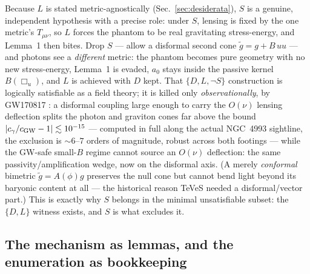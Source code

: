 \documentclass[11pt]{article}
\newcommand{\Boxu}{\Box_u}
\newcommand{\cgw}{c_{\rm GW}}
\begin{document}
Because $L$ is stated metric-agnostically (Sec.~\ref{sec:desiderata}), $S$ is a genuine, independent hypothesis with a precise role: under $S$, lensing is fixed by the one metric's $T_{\mu\nu}$, so $L$ forces the phantom to be real gravitating stress-energy, and Lemma~1 then bites. Drop $S$ --- allow a disformal second cone $\tilde g=g+B\,uu$ --- and photons see a \emph{different} metric: the phantom becomes pure geometry with no new stress-energy, Lemma~1 is evaded, $a_0$ stays inside the passive kernel $B(\Boxu)$, and $L$ is achieved with $D$ kept. That $\{D,L,\lnot S\}$ construction is logically satisfiable as a field theory; it is killed only \emph{observationally}, by GW170817 \cite{abbott2017}: a disformal coupling large enough to carry the $O(\nu)$ lensing deflection splits the photon and graviton cones far above the bound $|c_\gamma/\cgw-1|\lesssim10^{-15}$ --- computed in full along the actual NGC~4993 sightline, the exclusion is ${\sim}6$--$7$ orders of magnitude, robust across both footings \cite{zftE,boran2018} --- while the GW-safe small-$B$ regime cannot source an $O(\nu)$ deflection: the same passivity/amplification wedge, now on the disformal axis. (A merely \emph{conformal} bimetric $\tilde g=A(\phi)g$ preserves the null cone but cannot bend light beyond its baryonic content at all --- the historical reason TeVeS \cite{bekenstein2004} needed a disformal/vector part.) This is exactly why $S$ belongs in the minimal unsatisfiable subset: the $\{D,L\}$ witness exists, and $S$ is what excludes it.

\subsection{The mechanism as lemmas, and the enumeration as bookkeeping}
\end{document}
